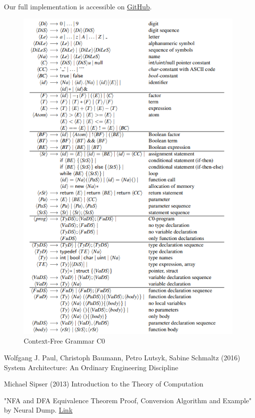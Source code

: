 \documentclass[11pt]{report}
\begin{document}
    Our full implementation is accessible on \href{https://github.com/fyfsb/dcfg.git}{GitHub}.


    \begin{figure}[h!]
        \center
        \includegraphics[width=13cm]{C0.png}
        \caption{Context-Free Grammar C0}
        \label{fig:grammar_c0}
    \end{figure}

    \tableofcontents
    
    

    \begin{thebibliography}{9}
        Wolfgang J. Paul, Christoph Baumann, Petro Lutsyk, Sabine Schmaltz (2016) System Architecture: An Ordinary Engineering Discipline

        Michael Sipser (2013) Introduction to the Theory of Computation

        "NFA and DFA Equivalence Theorem Proof, Conversion Algorithm and Example"
        by Neural Dump. \href{https://neuraldump.net/2017/11/nfa-and-dfa-equivalence-theorem-proof-and-example/}{Link}
    \end{thebibliography}
\end{document}
